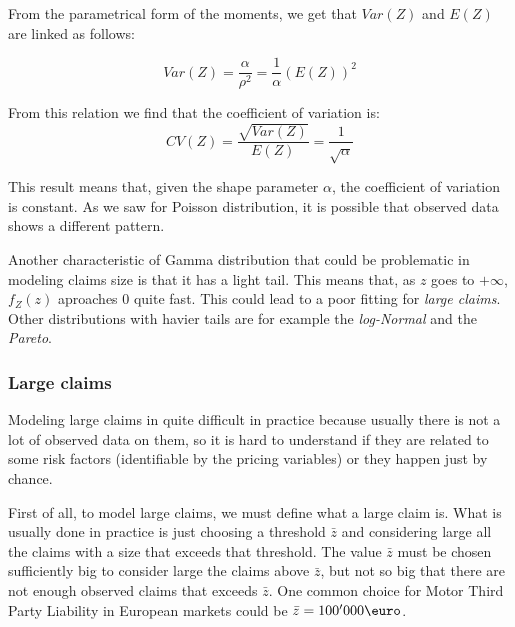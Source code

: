\documentclass[a4paper, nobind]{templates/ociamthesis}
\theoremstyle{definition}
\theoremstyle{definition}
\theoremstyle{definition}
\theoremstyle{remark}
\begin{document}
From the parametrical form of the moments, we get that \(Var(Z)\) and \(E(Z)\) are linked as follows:

\[Var(Z) = \frac{\alpha}{\rho^2} = \frac{1}{\alpha} \left(E(Z) \right)^ 2\]

From this relation we find that the coefficient of variation is:
\[CV(Z) = \frac{\sqrt{Var(Z)}}{E(Z)} = \frac{1}{\sqrt{\alpha}}\]

This result means that, given the shape parameter \(\alpha\), the coefficient of variation is constant. As we saw for Poisson distribution, it is possible that observed data shows a different pattern.

Another characteristic of Gamma distribution that could be problematic in modeling claims size is that it has a light tail. This means that, as \(z\) goes to \(+\infty\), \(f_Z(z)\) aproaches \(0\) quite fast. This could lead to a poor fitting for \emph{large claims}. Other distributions with havier tails are for example the \emph{log-Normal} and the \emph{Pareto}.

\hypertarget{chap:large-claims}{%
\subsubsection{Large claims}\label{chap:large-claims}}

Modeling large claims in quite difficult in practice because usually there is not a lot of observed data on them, so it is hard to understand if they are related to some risk factors (identifiable by the pricing variables) or they happen just by chance.

First of all, to model large claims, we must define what a large claim is. What is usually done in practice is just choosing a threshold \(\bar{z}\) and considering large all the claims with a size that exceeds that threshold. The value \(\bar{z}\) must be chosen sufficiently big to consider large the claims above \(\bar{z}\), but not so big that there are not enough observed claims that exceeds \(\bar{z}\). One common choice for Motor Third Party Liability in European markets could be \(\bar{z} = 100' 000 \text{\euro}\).
\end{document}
